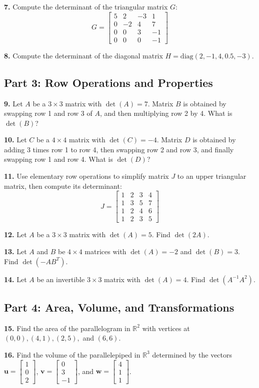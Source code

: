 \documentclass[11pt]{article}
\begin{document}
\textbf{7.} Compute the determinant of the triangular matrix $G$:
$$G = \begin{bmatrix} 5 & 2 & -3 & 1 \\ 0 & -2 & 4 & 7 \\ 0 & 0 & 3 & -1 \\ 0 & 0 & 0 & -1 \end{bmatrix}$$

\textbf{8.} Compute the determinant of the diagonal matrix $H = \text{diag}(2, -1, 4, 0.5, -3)$.

\subsection*{Part 3: Row Operations and Properties}

\textbf{9.} Let $A$ be a $3 \times 3$ matrix with $\det(A) = 7$. Matrix $B$ is obtained by swapping row 1 and row 3 of $A$, and then multiplying row 2 by 4. What is $\det(B)$?

\textbf{10.} Let $C$ be a $4 \times 4$ matrix with $\det(C) = -4$. Matrix $D$ is obtained by adding 3 times row 1 to row 4, then swapping row 2 and row 3, and finally swapping row 1 and row 4. What is $\det(D)$?

\textbf{11.} Use elementary row operations to simplify matrix $J$ to an upper triangular matrix, then compute its determinant:
$$J = \begin{bmatrix} 1 & 2 & 3 & 4 \\ 1 & 3 & 5 & 7 \\ 1 & 2 & 4 & 6 \\ 1 & 2 & 3 & 5 \end{bmatrix}$$

\textbf{12.} Let $A$ be a $3 \times 3$ matrix with $\det(A) = 5$. Find $\det(2A)$.

\textbf{13.} Let $A$ and $B$ be $4 \times 4$ matrices with $\det(A) = -2$ and $\det(B) = 3$. Find $\det(-A B^T)$.

\textbf{14.} Let $A$ be an invertible $3 \times 3$ matrix with $\det(A) = 4$. Find $\det(A^{-1} A^2)$.

\subsection*{Part 4: Area, Volume, and Transformations}

\textbf{15.} Find the area of the parallelogram in $\mathbb{R}^2$ with vertices at $(0,0), (4,1), (2,5),$ and $(6,6)$.

\textbf{16.} Find the volume of the parallelepiped in $\mathbb{R}^3$ determined by the vectors $\mathbf{u} = \begin{bmatrix} 1 \\ 0 \\ 2 \end{bmatrix}$, $\mathbf{v} = \begin{bmatrix} 0 \\ 3 \\ -1 \end{bmatrix}$, and $\mathbf{w} = \begin{bmatrix} 4 \\ 1 \\ 1 \end{bmatrix}$.
\end{document}
